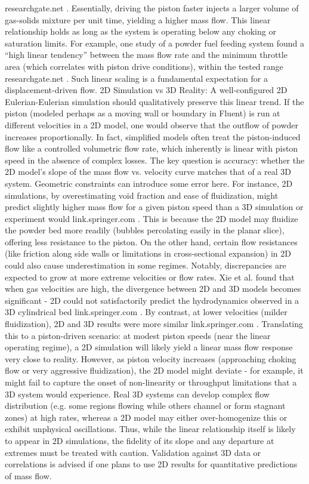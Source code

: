 researchgate.net
. Essentially, driving the piston faster injects a larger volume of gas-solids mixture per unit time, yielding a higher mass flow. This linear relationship holds as long as the system is operating below any choking or saturation limits. For example, one study of a powder fuel feeding system found a “high linear tendency” between the mass flow rate and the minimum throttle area (which correlates with piston drive conditions), within the tested range
researchgate.net
. Such linear scaling is a fundamental expectation for a displacement-driven flow. 2D Simulation vs 3D Reality: A well-configured 2D Eulerian-Eulerian simulation should qualitatively preserve this linear trend. If the piston (modeled perhaps as a moving wall or boundary in Fluent) is run at different velocities in a 2D model, one would observe that the outflow of powder increases proportionally. In fact, simplified models often treat the piston-induced flow like a controlled volumetric flow rate, which inherently is linear with piston speed in the absence of complex losses. The key question is accuracy: whether the 2D model’s slope of the mass flow vs. velocity curve matches that of a real 3D system. Geometric constraints can introduce some error here. For instance, 2D simulations, by overestimating void fraction and ease of fluidization, might predict slightly higher mass flow for a given piston speed than a 3D simulation or experiment would
link.springer.com
. This is because the 2D model may fluidize the powder bed more readily (bubbles percolating easily in the planar slice), offering less resistance to the piston. On the other hand, certain flow resistances (like friction along side walls or limitations in cross-sectional expansion) in 2D could also cause underestimation in some regimes. Notably, discrepancies are expected to grow at more extreme velocities or flow rates. Xie et al. found that when gas velocities are high, the divergence between 2D and 3D models becomes significant - 2D could not satisfactorily predict the hydrodynamics observed in a 3D cylindrical bed
link.springer.com
. By contrast, at lower velocities (milder fluidization), 2D and 3D results were more similar
link.springer.com
. Translating this to a piston-driven scenario: at modest piston speeds (near the linear operating regime), a 2D simulation will likely yield a linear mass flow response very close to reality. However, as piston velocity increases (approaching choking flow or very aggressive fluidization), the 2D model might deviate - for example, it might fail to capture the onset of non-linearity or throughput limitations that a 3D system would experience. Real 3D systems can develop complex flow distribution (e.g. some regions flowing while others channel or form stagnant zones) at high rates, whereas a 2D model may either over-homogenize this or exhibit unphysical oscillations. Thus, while the linear relationship itself is likely to appear in 2D simulations, the fidelity of its slope and any departure at extremes must be treated with caution. Validation against 3D data or correlations is advised if one plans to use 2D results for quantitative predictions of mass flow.
